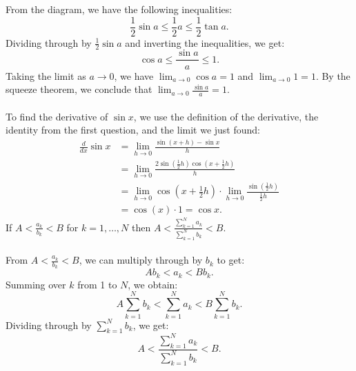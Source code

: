\documentclass[12pt]{exam}
\begin{document}
\begin{questions}
\begin{figure}[h!]
\end{figure}
\linebreak
From the diagram, we have the following inequalities:
\[
  \frac{1}{2}\sin a \leq \frac{1}{2}a \leq \frac{1}{2}\tan a.
\]
Dividing through by $\frac{1}{2}\sin a$ and inverting the inequalities, we get:
\[
 \cos a \leq \frac{\sin a}{a} \leq 1.
\]
Taking the limit as $a \to 0$, we have $\lim_{a \to 0} \cos a = 1$ and $\lim_{a \to 0} 1 = 1$. By the squeeze theorem, we conclude that $\lim_{a \to 0} \frac{\sin a}{a} = 1$.
\\\\
To find the derivative of $\sin x$, we use the definition of the derivative, the identity from the first question, and the limit we just found:
\begin{align*}
  \frac{d}{dx} \sin x &= \lim_{h \to 0} \frac{\sin(x+h) - \sin x}{h} \\
  &= \lim_{h \to 0} \frac{2\sin\left(\frac{1}{2}h\right) \cos\left(x + \frac{1}{2}h\right)}{h} \\
  &= \lim_{h \to 0} \cos\left(x + \frac{1}{2}h\right) \cdot \lim_{h \to 0} \frac{\sin\left(\frac{1}{2}h\right)}{\frac{1}{2}h} \\
  &= \cos(x) \cdot 1 = \cos x.
\end{align*}
\newpage 
\question
If $A < \frac{a_k}{b_k}<B$ for $k=1, \ldots, N$ then 
$A < \frac{\sum_{k=1}^{N}a_k}{\sum_{k=1}^{N}b_k} < B$.
\\\\
From $A < \frac{a_k}{b_k} < B$, we can multiply through by $b_k$ to get:
\[
  Ab_k < a_k < Bb_k.
\]
Summing over $k$ from 1 to $N$, we obtain:
\[
  A\sum_{k=1}^{N} b_k < \sum_{k=1}^{N} a_k < B\sum_{k=1}^{N} b_k.
\]
Dividing through by $\sum_{k=1}^{N} b_k$, we get:
\[
  A < \frac{\sum_{k=1}^{N} a_k}{\sum_{k=1}^{N} b_k} < B.
\]
\end{questions}
\end{document}
